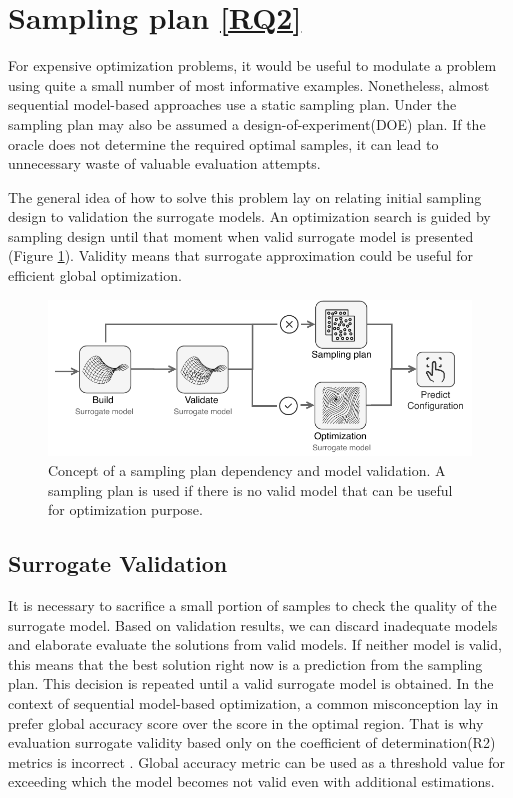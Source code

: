     \section{Sampling plan \ref{RQ2}}
        For expensive optimization problems, it would be useful to modulate a problem using quite a small number of most informative examples. Nonetheless, almost sequential model-based approaches use a static sampling plan. Under the sampling plan may also be assumed a design-of-experiment(DOE) plan. If the oracle does not determine the required optimal samples, it can lead to unnecessary waste of valuable evaluation attempts. 
        
        The general idea of how to solve this problem lay on relating initial sampling design to validation the surrogate models. An optimization search is guided by sampling design until that moment when valid surrogate model is presented (Figure \ref{fig:concept_sampling}). Validity means that surrogate approximation could be useful for efficient global optimization.

            \begin{figure}
                \centering
                \includegraphics[width=\textwidth]{content/images/dinamic_sampling_plan}
                \caption[Non-dominated points]{Concept of a sampling plan dependency and model validation. A sampling plan is used if there is no valid model that can be useful for optimization purpose.} 
                \label{fig:concept_sampling} 
            \end{figure}      

        \subsection{Surrogate Validation}
        It is necessary to sacrifice a small portion of samples to check the quality of the surrogate model. Based on validation results, we can discard inadequate models and elaborate evaluate the solutions from valid models. If neither model is valid, this means that the best solution right now is a prediction from the sampling plan. This decision is repeated until a valid surrogate model is obtained.
        In the context of sequential model-based optimization, a common misconception lay in prefer global accuracy score over the score in the optimal region. That is why evaluation surrogate validity based only on the coefficient of determination(R2) metrics is incorrect \cite{nardi2019practical}. Global accuracy metric can be used as a threshold value for exceeding which the model becomes not valid even with additional estimations.  

